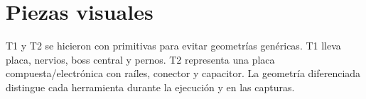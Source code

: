 \section{Piezas visuales}

T1 y T2 se hicieron con primitivas para evitar geometrías genéricas. T1 lleva
placa, nervios, boss central y pernos. T2 representa una placa compuesta/electrónica
con raíles, conector y capacitor. La geometría diferenciada distingue
cada herramienta durante la ejecución y en las capturas.

